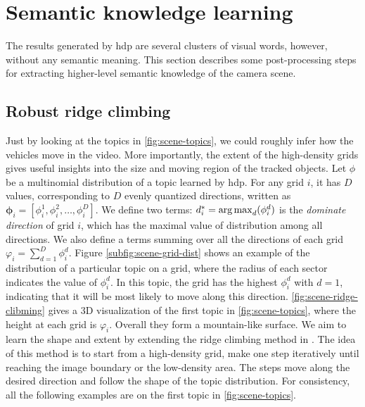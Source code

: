 \section{Semantic knowledge learning}
\label{sec:scene-ridge-climbing}
The results generated by \gls{hdp} are several clusters of visual words, however, without any semantic meaning.
This section describes some post-processing steps for extracting higher-level semantic knowledge of the camera scene.

\subsection{Robust ridge climbing}
    Just by looking at the topics in \ref{fig:scene-topics}, we could roughly infer how the vehicles move in the video. 
    More importantly, the extent of the high-density grids gives useful insights into the size and moving region of the tracked objects. 
    Let $\phi$ be a multinomial distribution of a topic learned by \gls{hdp}. For any grid $i$, it has $D$ values, corresponding to $D$ evenly quantized directions, written as $\bm{\phi}_i= [\phi_i^{1}, \phi_i^{2}, \dots, \phi_i^{D}]$.
    We define two terms:
    $d^*_i = \operatorname*{arg\,max}_{d}(\phi_i^{d})$ is the \emph{dominate direction} of grid $i$, which has the maximal value of distribution among all directions.
    We also define a terms summing over all the directions of each grid $\varphi_{i} = \sum_{d=1}^{D}{\phi_i^{d}}$.
    Figure \ref{subfig:scene-grid-dist} shows an example of the distribution of a particular topic on a grid, where the radius of each sector indicates the value of $\phi_i^{d}$. 
    In this topic, the grid has the highest $\phi_i^d$ with $d=1$, indicating that it will be most likely to move along this direction. 
    \ref{fig:scene-ridge-clibming} gives a 3D visualization of the first topic in \ref{fig:scene-topics}, where the height at each grid is $\varphi_{i}$. 
    Overall they form a mountain-like surface. We aim to learn the shape and extent by extending the ridge climbing method in \cite{zhao2013counting}. 
    The idea of this method is to start from a high-density grid, make one step iteratively until reaching the image boundary or the low-density area. 
    The steps move along the desired direction and follow the shape of the topic distribution. 
    For consistency, all the following examples are on the first topic in \ref{fig:scene-topics}.
    
    


